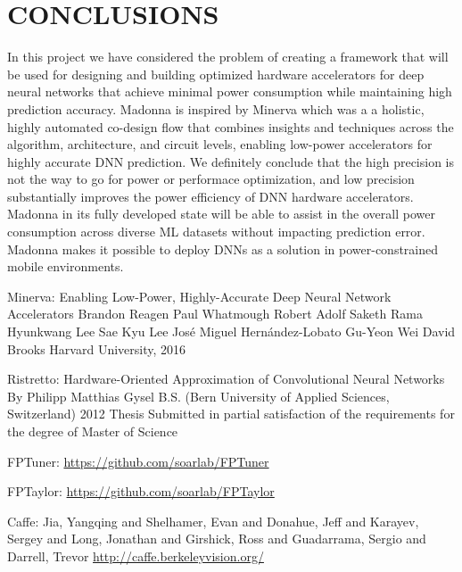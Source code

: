 \documentclass[letterpaper, 10 pt, conference]{ieeeconf}
\begin{document}
\section{CONCLUSIONS}

In this project we have considered the problem of creating 
a framework that will be used for designing
and building optimized hardware accelerators for deep neural
networks that achieve minimal power consumption while
maintaining high prediction accuracy. Madonna is inspired
by Minerva which was a a holistic,
highly automated co-design flow that combines insights
and techniques across the algorithm, architecture, and circuit
levels, enabling low-power accelerators for highly accurate
DNN prediction. We definitely conclude that the high precision
is not the way to go for power or performace optimization, 
and low precision substantially improves the power efficiency
of DNN hardware accelerators.
Madonna in its fully developed state will be able to 
assist in the overall power consumption
across diverse ML datasets without impacting prediction error.
Madonna makes it
possible to deploy DNNs as a solution in power-constrained
mobile environments.

\begin{thebibliography}{99}

 Minerva: Enabling Low-Power, Highly-Accurate
Deep Neural Network Accelerators
Brandon Reagen Paul Whatmough Robert Adolf Saketh Rama
Hyunkwang Lee Sae Kyu Lee José Miguel Hernández-Lobato
Gu-Yeon Wei David Brooks
Harvard University, 2016 

 Ristretto: Hardware-Oriented Approximation of Convolutional Neural Networks
By Philipp Matthias Gysel B.S. (Bern University of Applied Sciences, Switzerland) 2012
Thesis Submitted in partial satisfaction of the requirements for the degree of
Master of Science

 FPTuner: \url{https://github.com/soarlab/FPTuner}

 FPTaylor: \url{https://github.com/soarlab/FPTaylor}

 Caffe: Jia, Yangqing and Shelhamer, Evan and Donahue, Jeff and Karayev, Sergey and Long, Jonathan and Girshick, Ross and Guadarrama, Sergio and Darrell, Trevor
  \url{http://caffe.berkeleyvision.org/}

\end{thebibliography}
\end{document}
